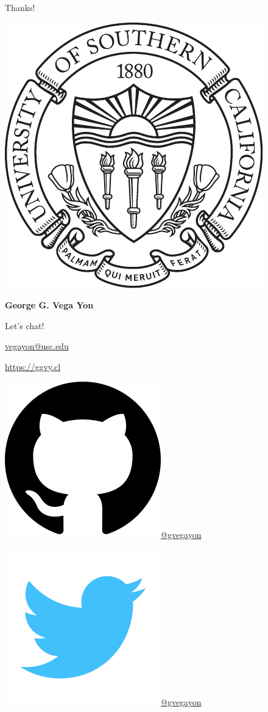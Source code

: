 \documentclass[10pt,ignorenonframetext,handout,aspectratio=169,]{beamer}
\begin{document}
\begin{frame}{Thanks!}
\protect\hypertarget{thanks}{}

\begin{centering}
\includegraphics[width = .1\linewidth]{usc.pdf}

\large \textbf{\textcolor{USCCardinal}{George G. Vega Yon}}

\normalsize Let's chat! 

\href{mailto:vegayon@usc.edu}{vegayon@usc.edu} 

\href{https://ggvy.cl}{https://ggvy.cl} 

\includegraphics[width=.02\linewidth]{github.png}\href{https://github.com/gvegayon}{@gvegayon}

\includegraphics[width=.02\linewidth]{twitter.png}\href{https://twitter.com/gvegayon}{@gvegayon}

\end{centering}

\end{frame}

\begin{frame}

\appendix

\end{frame}
\end{document}
